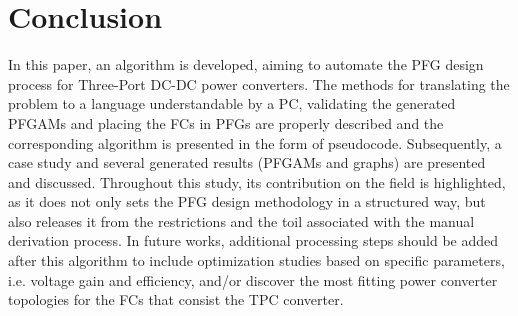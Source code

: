 \documentclass[conference]{IEEEtran}
\begin{document}
\section{Conclusion}
In this paper, an algorithm is developed, aiming to automate the PFG design process for Three-Port DC-DC power converters. The methods for translating the problem to a language understandable by a PC, validating the generated PFGAMs and placing the FCs in PFGs are properly described and the corresponding algorithm is presented in the form of pseudocode. Subsequently, a case study and several generated results (PFGAMs and graphs) are presented and discussed. Throughout this study, its contribution on the field is highlighted, as it does not only sets the PFG design methodology in a structured way, but also releases it from the restrictions and the toil associated with the manual derivation process. In future works, additional processing steps should be added after this algorithm to include optimization studies based on specific parameters, i.e. voltage gain and efficiency, and/or discover the most fitting power converter topologies for the FCs that consist the TPC converter.
\\
\\
\\
\\

\printbibliography
\end{document}
